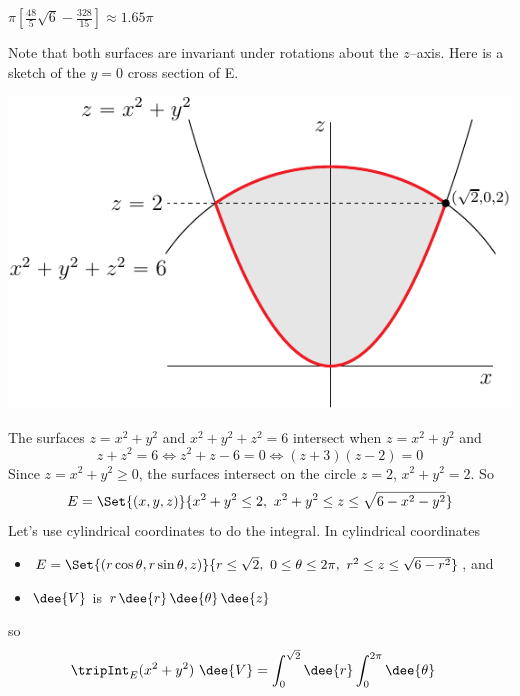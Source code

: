 %

\begin{answer}
$\pi\left[\frac{48}{5}\sqrt{6}-\frac{328}{15}\right] 
\approx 1.65\pi$
\end{answer}

\begin{solution}
Note that both surfaces are invariant under rotations about the
$z$--axis. Here is a sketch of the $y=0$ cross section of E.
\begin{center}
     \includegraphics{fig/OE12A_9.pdf}
\end{center}
The surfaces $z = x^2 + y^2$ and $x^2 + y^2 + z^2 = 6$
intersect when $z=x^2+y^2$ and
\begin{equation*}
z+z^2=6
\iff z^2+z-6=0
\iff(z+3)(z-2)=0
\end{equation*}
Since $z=x^2+y^2\ge 0$, the surfaces intersect on the circle $z=2$,
$x^2+y^2=2$. So 
\begin{equation*}
E = \Set{(x,y,z)}{ x^2+y^2\le 2,\ x^2+y^2\le z\le \sqrt{6-x^2-y^2}}
\end{equation*}
Let's use cylindrical coordinates to do the integral.
In cylindrical coordinates 
\begin{itemize}
\item
$E = \Set{(r\cos\theta,r\sin\theta,z)}{ r\le \sqrt{2},\ 0\le\theta\le 2\pi,\ 
                                     r^2\le z\le \sqrt{6-r^2}}$, and
\item
$\dee{V}$ is $r\,\dee{r}\,\dee{\theta}\,\dee{z}$
\end{itemize}
so
\begin{align*}
\tripInt_E (x^2+y^2)\ \dee{V}
&=\int_0^{\sqrt{2}}\dee{r} \int_0^{2\pi}\dee{\theta}

\end{align*}
\end{solution}
